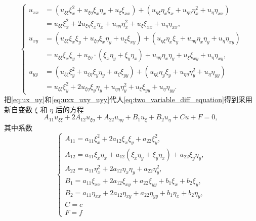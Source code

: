 \begin{equation}
    \left\{\begin{aligned}
        u_{x x} & =\left(u_{\xi \xi} \xi_x^2+u_{\xi \eta} \xi_x \eta_x+u_{\xi} \xi_{x x}\right)+\left(u_{\eta \xi} \eta_x \xi_x+u_{\eta \eta} \eta_x^2+u_\eta \eta_{x x}\right) \\
        & =u_{\xi \xi} \xi_x^2+2 u_{\xi \eta} \xi_x \eta_x+u_{\eta \eta} \eta_x^2+u_{\xi} \xi_{x x}+u_\eta \eta_{x x}, \\
        u_{x y} & =\left(u_{\xi \xi} \xi_x \xi_y+u_{\xi \eta} \xi_x \eta_y+u_{\xi} \xi_{x y}\right)+\left(u_{\eta \xi} \eta_x \xi_y+u_{\eta \eta} \eta_x \eta_y+u_\eta \eta_{x y}\right) \\
        & =u_{\xi \xi} \xi_x \xi_y+u_{\xi \eta} \cdot\left(\xi_x \eta_y+\xi_y \eta_x\right)+u_{\eta \eta} \eta_x \eta_y+u_{\xi} \xi_{x y}+u_\eta \eta_{x y}, \\
        u_{y y} & =\left(u_{\xi \xi} \xi_y^2+u_{\xi \eta} \xi_y \eta_y+u_{\xi} \xi_{y y}\right)+\left(u_{\eta \xi} \eta_y \xi_y+u_{\eta \eta} \eta_y^2+u_\eta \eta_{y y}\right) \\
        & =u_{\xi \xi} \xi_y^2+2 u_{\xi \eta} \xi_y \eta_y+u_{\eta \eta} \eta_y^2+u_{\xi} \xi_{y y}+u_\eta \eta_{y y} .
        \end{aligned}\right.
        \label{eq:uxx_uxy_uyy}
\end{equation}
把\eqref{eq:ux_uy}和\eqref{eq:uxx_uxy_uyy}代人\eqref{eq:two_variable_diff_equation}得到采用新自变数 $\xi$ 和 $\eta$ 后的方程
\begin{equation}
    A_{11} u_{\xi \xi}+2 A_{12} u_{\xi \eta}+A_{22} u_{\eta \eta}+B_1 u_{\xi}+B_2 u_\eta+C u+F=0 \text {, }
    \label{eq:two_variable_transformed_diff_equation}
\end{equation}
其中系数
\begin{equation}
    \left\{\begin{array}{l}A_{11}=a_{11} \xi_x^2+2 a_{12} \xi_x \xi_y+a_{22} \xi_y^2, 
        \\ 
        A_{12}=a_{11} \xi_x \eta_x+a_{12}\left(\xi_x \eta_y+\xi_y \eta_x\right)+a_{22} \xi_y \eta_y, 
        \\ A_{22}=a_{11} \eta_x^2+2 a_{12} \eta_x \eta_y+a_{22} \eta_y^2, 
        \\ B_1=a_{11} \xi_{x x}+2 a_{12} \xi_{x y}+a_{22} \xi_{y y}+b_1 \xi_x+b_2 \xi_y, 
        \\ B_2=a_{11} \eta_{x x}+2 a_{12} \eta_{x y}+a_{22} \eta_{y y}+b_1 \eta_x+b_2 \eta_y, 
        \\ C=c 
        \\ F=f\end{array}\right.
        \label{eq:transformed_coeff}
\end{equation}
